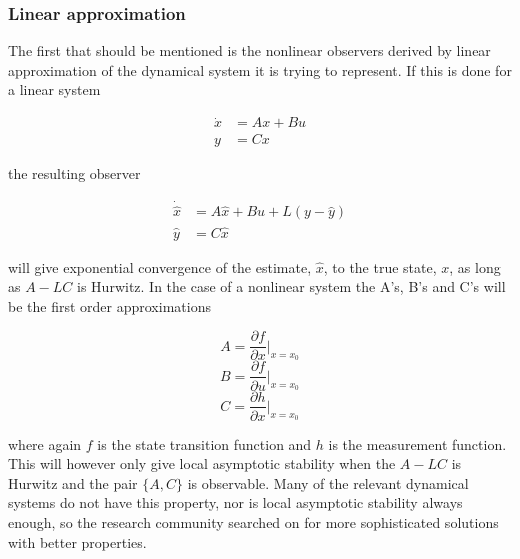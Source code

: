 \subsubsection{Linear approximation}

The first that should be mentioned is the nonlinear observers derived by linear approximation of the dynamical system it is trying to represent\cite{LinearizingNonlinObs}. If this is done for a linear system 

\begin{align}
    \Dot{x} &= Ax + Bu \\
    y &= Cx
\end{align}

the resulting observer

\begin{align}
    \Dot{\hat{x}} &= A\hat{x} + Bu + L(y - \hat{y}) \\
    \hat{y} &= C\hat{x}
\end{align}

will give exponential convergence of the estimate, $\hat{x}$, to the true state, $x$, as long as $A-LC$ is Hurwitz\cite{Hurwitz}. In the case of a nonlinear system the A's, B's and C's will be the first order approximations

\begin{equation}
    A = \frac{\partial f}{\partial x}|_{x=x_0}
\end{equation}
\begin{equation}
    B = \frac{\partial f}{\partial u}|_{x=x_0}
\end{equation}
\begin{equation}
    C = \frac{\partial h}{\partial x}|_{x=x_0}
\end{equation}

where again $f$ is the state transition function and $h$ is the measurement function. This will however only give local asymptotic stability when the $A-LC$ is Hurwitz and the pair $\{A,C\}$ is observable. Many of the relevant dynamical systems do not have this property, nor is local asymptotic stability always enough, so the research community searched on for more sophisticated solutions with better properties. 


